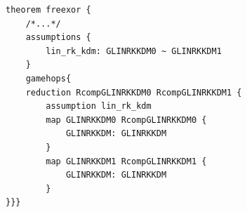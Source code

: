 \begin{longlisting}
\begin{verbatim}
theorem freexor {
    /*...*/
    assumptions {
        lin_rk_kdm: GLINRKKDM0 ~ GLINRKKDM1
    }
    gamehops{
    reduction RcompGLINRKKDM0 RcompGLINRKKDM1 {
        assumption lin_rk_kdm
        map GLINRKKDM0 RcompGLINRKKDM0 {
            GLINRKKDM: GLINRKKDM
        }
        map GLINRKKDM1 RcompGLINRKKDM1 {
            GLINRKKDM: GLINRKKDM
        }
}}}
\end{verbatim}
\caption{Reduction game hop in the theorem}
\label{lst:domino-theorem-reduction-gamehop}
\end{longlisting}
